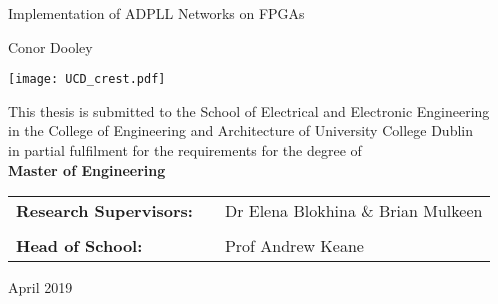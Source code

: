 \documentclass[11pt,british]{report}
\begin{document}
\begin{titlepage}
	\begin{spacing}{3}
		\noindent \begin{center}
		{\huge{}Implementation of ADPLL Networks on FPGAs}
		\par\end{center}{\huge \par}
	\end{spacing}
	\bigskip{}
	\begin{center}
		{\Large{}Conor Dooley}
	\end{center}
	\vspace{1.25cm}
	\begin{center}
		\texttt{[image: UCD\_crest.pdf]}\vspace{0.25cm}
	\end{center}
	\bigskip{}
	\begin{center}
		{\large{}This thesis is submitted to the School of Electrical and Electronic Engineering\\ \vspace{0.5cm}
		in the College of Engineering and Architecture of University College Dublin \\ \vspace{0.5cm}
		in partial fulfilment for the requirements for the degree of \\ \vspace{0.5cm}
		\textbf{Master of Engineering} }
	\end{center}
	\vspace{1.cm}
	{\Large{}\bigskip{}
	\bigskip{}
	}{\Large \par}
	\noindent
	\begin{center}
		\begin{tabular}{lll}
			\textbf{\large{}Research Supervisors:} & \qquad{}\qquad{} & {\large{}Dr Elena Blokhina \& Brian Mulkeen}\\
			&  & \\
			\textbf{\large{}Head of School:} & \qquad{}\qquad{} & {\large{}Prof Andrew Keane}\\
		\end{tabular}
	\par\end{center}
	
	\vspace{1cm}
	\noindent
	\begin{center}
		{\large{}April 2019}
		\par
	\end{center}{\large \par}
\end{titlepage}
\end{document}
